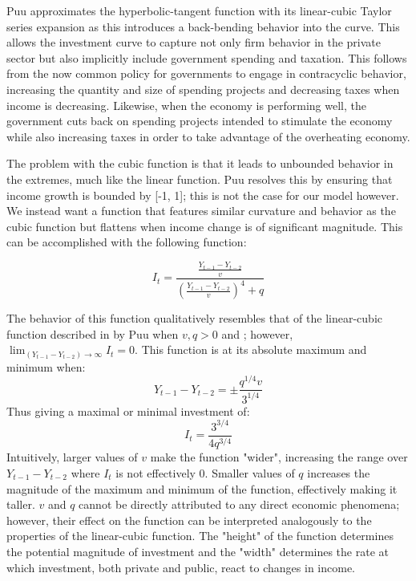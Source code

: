 Puu approximates the hyperbolic-tangent function with its linear-cubic Taylor series expansion as this introduces a back-bending behavior into the curve. This allows the investment curve to capture not only firm behavior in the private sector but also implicitly include government spending and taxation. This follows from the now common policy for governments to engage in contracyclic behavior, increasing the quantity and size of spending projects and decreasing taxes when income is decreasing. Likewise, when the economy is performing well, the government cuts back on spending projects intended to stimulate the economy while also increasing taxes in order to take advantage of the overheating economy. 

The problem with the cubic function is that it leads to unbounded behavior in the extremes, much like the linear function. Puu resolves this by ensuring that income growth is bounded by [-1, 1]; this is not the case for our model however. We instead want a function that features similar curvature and behavior as the cubic function but flattens when income change is of significant magnitude. This can be accomplished with the following function:

\begin{equation}
    I_t = \frac{\frac{Y_{t-1}-Y_{t-2}}{v}}{(\frac{Y_{t-1}-Y_{t-2}}{v})^4+q}	
\end{equation}

The behavior of this function qualitatively resembles that of the linear-cubic function described in by Puu when $v,q>0$ and ; however, $\lim_{(Y_{t-1}-Y_{t-2})\to\infty}I_t=0$. This function is at its absolute maximum and minimum when:
\begin{equation*}
    Y_{t-1}-Y_{t-2}=\pm\frac{q^{1/4}v}{3^{1/4}}
\end{equation*}
Thus giving a maximal or minimal investment of:
\begin{equation*}
    I_t=\frac{3^{3/4}}{4q^{3/4}}
\end{equation*}
Intuitively, larger values of $v$ make the function "wider", increasing the range over $Y_{t-1}-Y_{t-2}$ where $I_t$ is not effectively 0. Smaller values of $q$ increases the magnitude of the maximum and minimum of the function, effectively making it taller. $v$ and $q$ cannot be directly attributed to any direct economic phenomena; however, their effect on the function can be interpreted analogously to the properties of the linear-cubic function. The "height" of the function determines the potential magnitude of investment and the "width" determines the rate at which investment, both private and public, react to changes in income.

